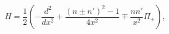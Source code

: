 \begin{equation}
H=\frac{1}{2}\left(-\frac{d^2}{dx^2}+\frac{(n\pm n')^2-1}
{4x^2}\mp \frac{nn'}{x^2}\Pi_+\right),
\label{hami1}
\end{equation}

